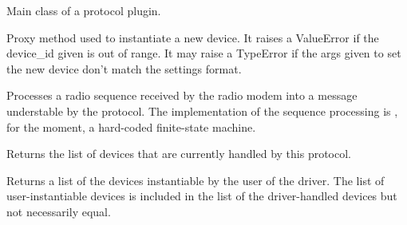\documentclass[letterpaper,10pt,english]{sphinxmanual}
\begin{document}
\begin{fulllineitems}
\label{implementation_examples:protocols.oregon.Oregon}
Main class of a protocol plugin.

\begin{fulllineitems}
\label{implementation_examples:protocols.oregon.Oregon.add_device}
Proxy method used to instantiate a new device. It raises a 
ValueError if the device\_id given is out of range. It may raise 
a TypeError if the args given to set the new device don't match 
the settings format.

\end{fulllineitems}


\begin{fulllineitems}
\label{implementation_examples:protocols.oregon.Oregon.decode_sequence}
Processes a radio sequence received by the radio modem 
into a message understable by the protocol.
The implementation of the sequence processing is , for the
moment, a hard-coded finite-state machine.

\end{fulllineitems}


\begin{fulllineitems}
\label{implementation_examples:protocols.oregon.Oregon.get_devices}
Returns the list of devices that are currently handled 
by this protocol.

\end{fulllineitems}


\begin{fulllineitems}
\label{implementation_examples:protocols.oregon.Oregon.get_instantiable_devices}
Returns a list of the devices instantiable by the user
of the driver. 
The list of user-instantiable devices is included in the 
list of the driver-handled devices but not necessarily 
equal.


\end{fulllineitems}
\end{fulllineitems}
\end{document}

